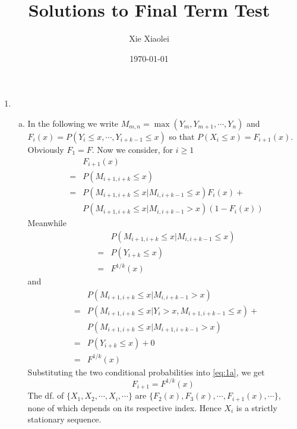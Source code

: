 \documentclass{report}
\author{Xie Xiaolei}
\date{\today}
\title{Solutions to Final Term Test}
\begin{document}
\maketitle

\begin{enumerate}[1.]
\item
  \begin{enumerate}[(a)]
  \item In the following we write $M_{m, n}=\max(Y_m, Y_{m+1}, \cdots,
    Y_n)$ and $F_i(x) = P(Y_i \le x, \cdots, Y_{i+k-1} \le x)$ so that
    $P(X_i \le x) = F_{i+1}(x)$. Obviously $F_1 = F$. Now we consider,
    for $i \ge 1$
    \begin{eqnarray}
      && F_{i+1}(x) \nonumber \\
      &=& P(M_{i+1, i+k} \le x) \nonumber \\
      &=& P(M_{i+1, i+k} \le x | M_{i, i+k-1} \le x) F_i(x) +
      \nonumber \\
      && P(M_{i+1, i+k} \le x | M_{i, i+k-1} > x) (1- F_i(x)) \label{eq:1a}
    \end{eqnarray}
    Meanwhile
    \begin{eqnarray*}
      && P(M_{i+1, i+k} \le x | M_{i, i+k-1} \le x) \\
      &=& P(Y_{i+k} \le x) \\
      &=& F^{1/k}(x)
    \end{eqnarray*}
    and
    \begin{eqnarray*}
      && P(M_{i+1, i+k} \le x | M_{i, i+k-1} > x) \\
      &=& P(M_{i+1, i+k} \le x | Y_i > x, M_{i+1, i+k-1} \le x) + \\
      && P(M_{i+1, i+k} \le x | M_{i+1, i+k-1} > x) \\
      &=& P(Y_{i+k} \le x) + 0 \\
      &=& F^{1/k}(x)
    \end{eqnarray*}
    Substituting the two conditional probabilities into \eqref{eq:1a},
    we get
    \[
    F_{i+1} = F^{1/k}(x)
    \]
    The df. of $\{X_1, X_2, \cdots, X_i, \cdots\}$ are $\{F_2(x), F_3(x),
    \cdots, F_{i+1}(x), \cdots\}$, none of which depends on its
    respective index. Hence $X_i$ is a strictly stationary sequence.
  \end{enumerate}
\end{enumerate}
\end{document}
